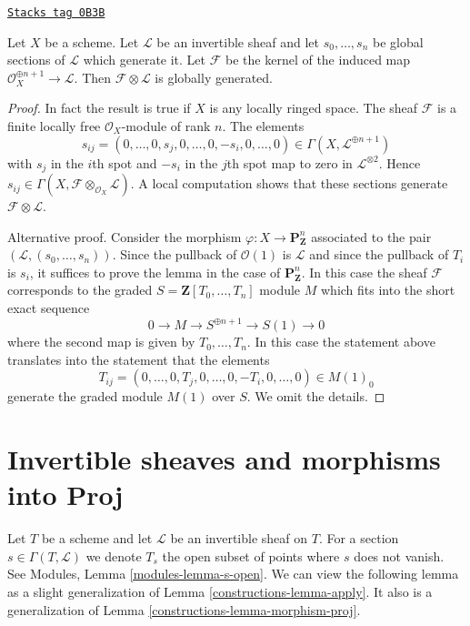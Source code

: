 \begin{lemma}
\label{constructions-lemma-globally-generated-omega-twist-1}
\href{https://stacks.math.columbia.edu/tag/0B3B}{\texttt{Stacks tag 0B3B}}

Let $X$ be a scheme. Let $\mathcal{L}$ be an invertible sheaf
and let $s_0, \ldots, s_n$ be global sections of $\mathcal{L}$
which generate it. Let $\mathcal{F}$ be the kernel of the induced
map $\mathcal{O}_X^{\oplus n + 1} \to \mathcal{L}$.
Then $\mathcal{F} \otimes \mathcal{L}$ is globally generated.
\end{lemma}

\begin{proof}
In fact the result is true if $X$ is any locally ringed space.
The sheaf $\mathcal{F}$ is a finite locally free $\mathcal{O}_X$-module
of rank $n$. The elements
$$
s_{ij} = (0, \ldots, 0, s_j, 0, \ldots, 0, -s_i, 0, \ldots, 0)
\in \Gamma(X, \mathcal{L}^{\oplus n + 1})
$$
with $s_j$ in the $i$th spot and $-s_i$ in the $j$th spot map to zero
in $\mathcal{L}^{\otimes 2}$. Hence
$s_{ij} \in \Gamma(X, \mathcal{F} \otimes_{\mathcal{O}_X} \mathcal{L})$.
A local computation shows that these sections generate
$\mathcal{F} \otimes \mathcal{L}$.

\medskip\noindent
Alternative proof. Consider the morphism
$\varphi : X \to \mathbf{P}^n_\mathbf{Z}$ associated to
the pair $(\mathcal{L}, (s_0, \ldots, s_n))$. Since the pullback
of $\mathcal{O}(1)$ is $\mathcal{L}$ and since the pullback
of $T_i$ is $s_i$, it suffices to prove the lemma in the
case of $\mathbf{P}^n_\mathbf{Z}$. In this case the sheaf
$\mathcal{F}$ corresponds to the graded $S = \mathbf{Z}[T_0, \ldots, T_n]$
module $M$ which fits into the short exact sequence
$$
0 \to M \to S^{\oplus n + 1} \to S(1) \to 0
$$
where the second map is given by $T_0, \ldots, T_n$. In this
case the statement above translates into the statement that
the elements
$$
T_{ij} = (0, \ldots, 0, T_j, 0, \ldots, 0, -T_i, 0, \ldots, 0)
\in M(1)_0
$$
generate the graded module $M(1)$ over $S$. We omit the details.
\end{proof}

\section{Invertible sheaves and morphisms into Proj}
\label{constructions-section-invertible-proj}
Let $T$ be a scheme and let $\mathcal{L}$ be an invertible sheaf
on $T$. For a section $s \in \Gamma(T, \mathcal{L})$ we denote
$T_s$ the open subset of points where $s$ does not vanish. See
Modules, Lemma \ref{modules-lemma-s-open}. We can view the following
lemma as a slight generalization of Lemma \ref{constructions-lemma-apply}.
It also is a generalization of Lemma \ref{constructions-lemma-morphism-proj}.

